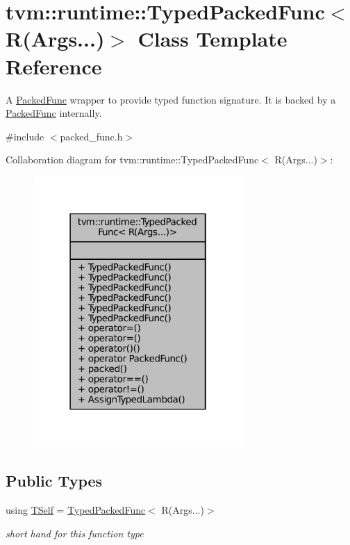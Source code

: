 \hypertarget{classtvm_1_1runtime_1_1TypedPackedFunc_3_01R_07Args_8_8_8_08_4}{}\section{tvm\+:\+:runtime\+:\+:Typed\+Packed\+Func$<$ R(Args...)$>$ Class Template Reference}
\label{classtvm_1_1runtime_1_1TypedPackedFunc_3_01R_07Args_8_8_8_08_4}


A \hyperlink{classtvm_1_1runtime_1_1PackedFunc}{Packed\+Func} wrapper to provide typed function signature. It is backed by a \hyperlink{classtvm_1_1runtime_1_1PackedFunc}{Packed\+Func} internally.  




{\ttfamily \#include $<$packed\+\_\+func.\+h$>$}



Collaboration diagram for tvm\+:\+:runtime\+:\+:Typed\+Packed\+Func$<$ R(Args...)$>$\+:
\nopagebreak
\begin{figure}[H]
\begin{center}
\leavevmode
\includegraphics[width=226pt]{classtvm_1_1runtime_1_1TypedPackedFunc_3_01R_07Args_8_8_8_08_4__coll__graph}
\end{center}
\end{figure}
\subsection*{Public Types}
\begin{DoxyCompactItemize}
\item 
using \hyperlink{classtvm_1_1runtime_1_1TypedPackedFunc_3_01R_07Args_8_8_8_08_4_afaeae1b79f815895ab9ab09b444e7ba3}{T\+Self} = \hyperlink{classtvm_1_1runtime_1_1TypedPackedFunc}{Typed\+Packed\+Func}$<$ R(Args...)$>$
\begin{DoxyCompactList}\small\item\em short hand for this function type \end{DoxyCompactList}\end{DoxyCompactItemize}

